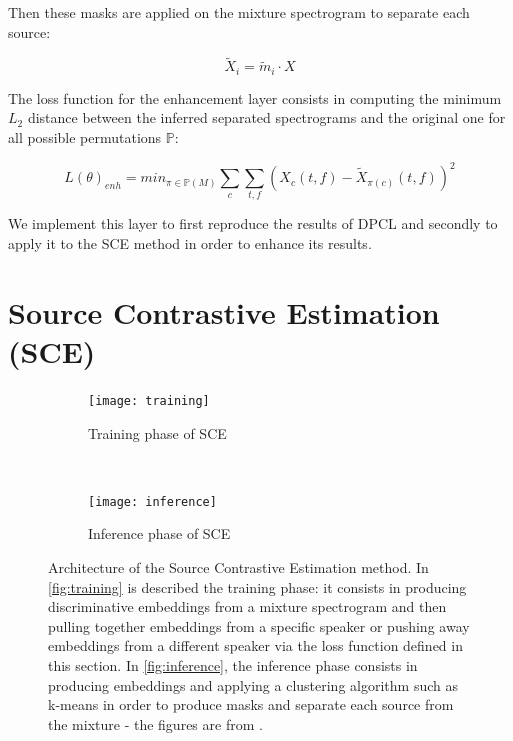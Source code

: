 \documentclass[master, tikz, final,11pt, dvipdfmx]{iscs-thesis}
\begin{document}
Then these masks are applied on the mixture spectrogram to separate each source:

\[
\tilde X_i = \tilde m_i \cdot X
\]

The loss function for the enhancement layer consists in computing the minimum $L_2$ distance between the inferred separated spectrograms and the original one for all possible permutations $\mathbb{P}$:

\[
L(\theta)_{enh} = min_{\pi \in \mathbb{P}(M)} \sum_{c} \sum_{t,f} (X_{c}(t,f) - \tilde X_{\pi(c)}(t,f))^2
\]

We implement this layer to first reproduce the results of DPCL \cite{DPCLV2} and secondly to apply it to the SCE method in order to enhance its results.

\section{Source Contrastive Estimation (SCE)}
\label{SCE}

\begin{figure}[h]
\centering
\begin{subfigure}[b]{\textwidth}
\texttt{[image: training]}
\captionsetup{justification=centering}
\caption{Training phase of SCE}
\label{fig:training} 
\end{subfigure}
\\
\begin{subfigure}[b]{\textwidth}
\texttt{[image: inference]}
\captionsetup{justification=centering}
\caption{Inference phase of SCE}
\label{fig:inference} 
\end{subfigure}
\caption[Architecture of the SCE approach - Training and Inference phases]{ Architecture of the Source Contrastive Estimation method. In \autoref{fig:training} is described the training phase: it consists in producing discriminative embeddings from a mixture spectrogram and then pulling together embeddings from a specific speaker or pushing away embeddings from a different speaker via the loss function defined in this section. In \autoref{fig:inference}, the inference phase consists in producing embeddings and applying a clustering algorithm such as k-means in order to produce masks and separate each source from the mixture - the figures are from \cite{SCE}.}
\label{fig:sce} 

\end{figure}
\end{document}
